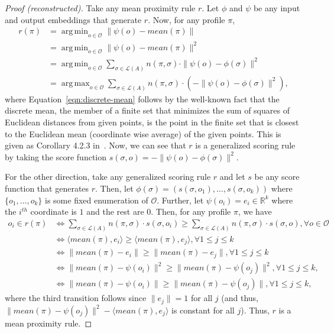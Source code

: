 \documentclass[10pt,letterpaper]{article}
\newcommand{\calL}{{\mathcal{L}}}
\newcommand{\rank}{{\calL(A)}}
\newcommand{\calO}{{\mathcal{O}}}
\DeclareMathOperator*{\argmax}{arg\,max}
\DeclareMathOperator*{\argmin}{arg\,min}
\begin{document}
\begin{proof}[Proof (reconstructed)]
Take any mean proximity rule $r$. Let $\phi$ and $\psi$ be any input and output embeddings that generate $r$. Now, for any profile $\pi$,
\begin{align}
r(\pi)  &= \argmin_{o \in \calO} \|\psi(o)-mean(\pi)\| \nonumber\\
&= \argmin_{o \in \calO} \|\psi(o)-mean(\pi)\|^2 \nonumber\\
&= \argmin_{o \in \calO} \sum_{\sigma \in \rank} n(\pi,\sigma) \cdot \|\psi(o)-\phi(\sigma)\|^2 \label{eqn:discrete-mean}\\
&= \argmax_{o \in \calO} \sum_{\sigma \in \rank} n(\pi,\sigma) \cdot \left( -\|\psi(o)-\phi(\sigma)\|^2 \right), \nonumber
\end{align}
where Equation~\eqref{eqn:discrete-mean} follows by the well-known fact that the discrete mean, the member of a finite set that minimizes the sum of squares of Euclidean distances from given points, is the point in the finite set that is closest to the Euclidean mean (coordinate wise average) of the given points.  This is given as Corollary 4.2.3 in~\cite{Zwicker08a}. Now, we can see that $r$ is a generalized scoring rule by taking the score function $s(\sigma,o) = -\|\psi(o)-\phi(\sigma)\|^2$. 

For the other direction, take any generalized scoring rule $r$ and let $s$ be any score function that generates $r$. Then, let $\phi(\sigma) = (s(\sigma,o_1),\ldots,s(\sigma,o_k))$ where $\{o_1,\ldots,o_k\}$ is some fixed enumeration of $\calO$. Further, let $\psi(o_i) = e_i \in \mathbb{R}^k$ where the $i^{th}$ coordinate is $1$ and the rest are $0$. Then, for any profile $\pi$, we have
\begin{align*}
o_i \in r(\pi) &\Leftrightarrow \sum_{\sigma \in \rank} n(\pi,\sigma) \cdot s(\sigma,o_i) \ge \sum_{\sigma \in \rank} n(\pi,\sigma) \cdot s(\sigma,o), \forall o \in \calO\\
&\Leftrightarrow \langle mean(\pi), e_i \rangle \ge \langle mean(\pi), e_j \rangle, \forall 1 \le j \le k \\
&\Leftrightarrow \|mean(\pi) - e_i\| \ge \|mean(\pi) - e_j\|, \forall 1 \le j \le k\\
&\Leftrightarrow \|mean(\pi) - \psi(o_i)\|^2 \ge \|mean(\pi) - \psi(o_j)\|^2, \forall 1 \le j \le k,\\
&\Leftrightarrow \|mean(\pi) - \psi(o_i)\| \ge \|mean(\pi) - \psi(o_j)\|, \forall 1 \le j \le k,
\end{align*}
where the third transition follows since $\|e_j\| = 1$ for all $j$ (and thus, $\|mean(\pi) - \psi(o_j)\|^2 - \langle mean(\pi), e_j \rangle$ is constant for all $j$). Thus, $r$ is a mean proximity rule.
\end{proof}
\end{document}
